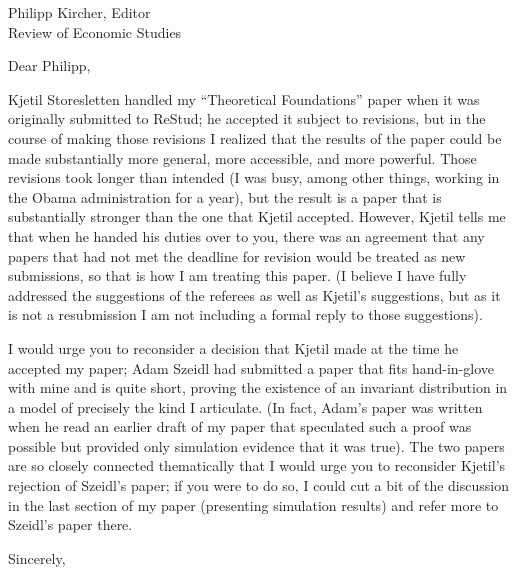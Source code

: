 \documentclass[12pt]{letter}
\begin{document}
\begin{letter}{
Philipp Kircher, Editor \\
Review of Economic Studies
}

\opening{Dear Philipp,}

Kjetil Storesletten handled my ``Theoretical Foundations'' paper when
it was originally submitted to ReStud; he accepted it subject to
revisions, but in the course of making those revisions I realized that
the results of the paper could be made substantially more general,
more accessible, and more powerful.  Those revisions took longer than
intended (I was busy, among other things, working in the Obama
administration for a year), but the result is a paper that is
substantially stronger than the one that Kjetil accepted.  However,
Kjetil tells me that when he handed his duties over to you, there was
an agreement that any papers that had not met the deadline for
revision would be treated as new submissions, so that is how I am
treating this paper.  (I believe I have fully addressed the suggestions of 
the referees as well as Kjetil's suggestions, but as it is not a resubmission I am 
not including a formal reply to those suggestions).

I would urge you to reconsider a decision that Kjetil made at the time
he accepted my paper; Adam Szeidl had submitted a paper that fits
hand-in-glove with mine and is quite short, proving the existence of
an invariant distribution in a model of precisely the kind I
articulate.  (In fact, Adam's paper was written when he read an earlier
draft of my paper that speculated such a proof was possible but
provided only simulation evidence that it was true).  The two papers
are so closely connected thematically that I would urge you to
reconsider Kjetil's rejection of Szeidl's paper; if you were to do so,
I could cut a bit of the discussion in the last section of my paper
(presenting simulation results) and refer more to Szeidl's paper
there.

\closing{Sincerely,}


\end{letter}
\end{document}
